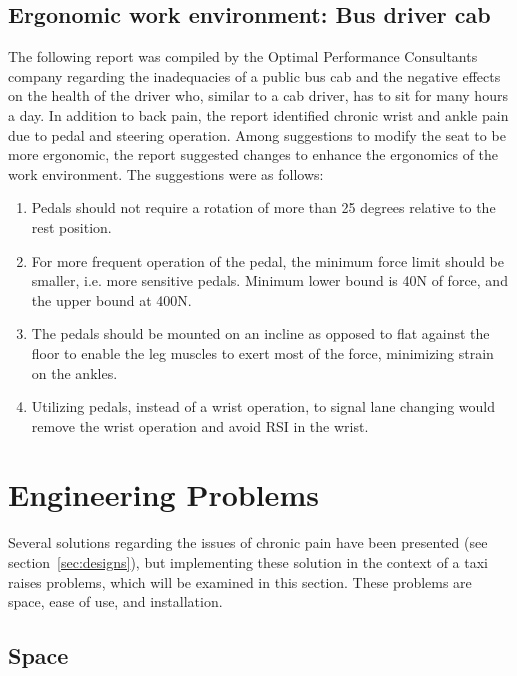 \documentclass[11pt]{article}
\begin{document}
\subsection{Ergonomic work environment: Bus driver cab}
The following report was compiled by the Optimal Performance Consultants company regarding the 
inadequacies of a public bus cab and the negative effects on the health of the driver who, similar to a cab driver, has to sit 
for many hours a day\cite{Ismail2003}. In addition to back pain, the report 
identified chronic wrist and ankle pain due to pedal and steering operation. Among suggestions to modify the 
seat to be more ergonomic, the report suggested changes to enhance the ergonomics of the work environment. 
The suggestions were as follows:
\begin{enumerate}
\item Pedals should not require a rotation of more than 25 degrees relative to the rest position. 
\item For more frequent operation of the pedal, the minimum force limit should be smaller, 
i.e. more sensitive pedals. Minimum lower bound is 40N of force, and the upper bound at 400N.
\item The pedals should be mounted on an incline as opposed to flat against the floor to enable the leg 
muscles to exert most of the force, minimizing strain on the ankles. 
\item Utilizing pedals, instead of a wrist operation, to signal lane changing would remove the wrist operation
and avoid RSI in the wrist.
\end{enumerate}


\section{Engineering Problems}
\label{sec:engprob}
Several solutions regarding the issues of chronic pain have been presented
(see section~\ref{sec:designs}), but implementing these solution in the context
of a taxi raises problems, which will be examined in this section. These 
problems are space, ease of use, and installation.

\subsection{Space}
\label{sec:space}
\end{document}
